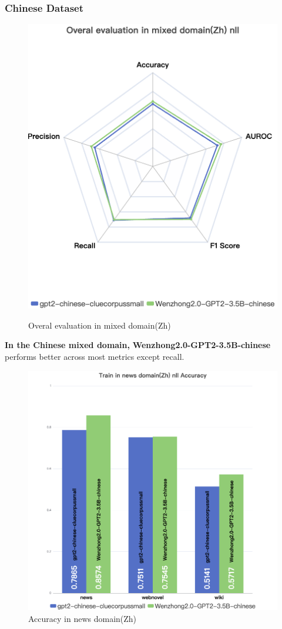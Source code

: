 \documentclass[lettersize,journal]{IEEEtran}
\begin{document}
\subsubsection{Chinese Dataset}

    \begin{figure}[H]
        \centering
        \includegraphics[width=0.6\linewidth]{images/Overal evaluation in mixed domain(Zh) nll.png}
        \label{fig:enter-label}
        \caption{Overal evaluation in mixed domain(Zh)}
    \end{figure}
  

\textbf{In the Chinese mixed domain,} \textbf{Wenzhong2.0-GPT2-3.5B-chinese} performs better across most metrics except recall.


     \begin{figure}[H]
        \centering
    \includegraphics[width=0.6\linewidth]{images/Train in news domain(Zh) nll Accuracy.png}
    \caption{Accuracy in news domain(Zh)}
 \end{figure}
 
\end{document}
